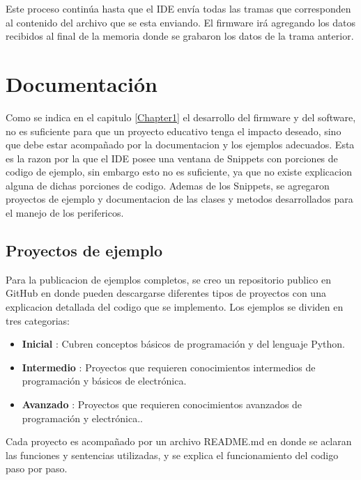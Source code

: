 Este proceso continúa hasta que el IDE envía todas las tramas que corresponden al contenido del archivo que se esta enviando.
El firmware irá agregando los datos recibidos al final de la memoria donde se grabaron los datos de la trama anterior.



\section{Documentación}

Como se indica en el capitulo \ref{Chapter1} el desarrollo del firmware y del software, no es suficiente para que un proyecto educativo tenga el impacto deseado, sino que debe estar acompañado por la documentacion y los ejemplos adecuados. Esta es la razon por la que el IDE posee una ventana de Snippets con porciones de codigo de ejemplo, sin embargo esto no es suficiente, ya que no existe explicacion alguna de dichas porciones de codigo. 
Ademas de los Snippets, se agregaron proyectos de ejemplo y documentacion de las clases y metodos desarrollados para el manejo de los perifericos.

\subsection{Proyectos de ejemplo} 

Para la publicacion de ejemplos completos, se creo un repositorio publico en GitHub\cite{repoejemplos} en donde pueden descargarse diferentes tipos de proyectos con una explicacion detallada del codigo que se implemento. Los ejemplos se dividen en tres categorias:

\begin{itemize}
	\item \textbf{Inicial} : Cubren conceptos básicos de programación y del lenguaje Python.
	\item \textbf{Intermedio} : Proyectos que requieren conocimientos intermedios de programación y básicos de electrónica.
	\item \textbf{Avanzado} : Proyectos que requieren conocimientos avanzados de programación y electrónica..	
\end{itemize}

Cada proyecto es acompañado por un archivo README.md en donde se aclaran las funciones y sentencias utilizadas, y se explica el funcionamiento del codigo paso por paso.

